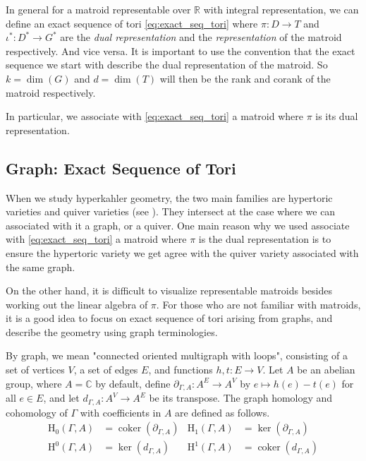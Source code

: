 \documentclass[b5paper]{article}
\newcommand{\HH}{\mathrm{H}}
\newcommand{\coker}{\operatorname{coker}}
\begin{document}
In general for a matroid representable over $\mathbb{R}$ with integral representation, we can define an exact sequence of tori \ref{eq:exact_seq_tori} where $\pi:D\rightarrow T$ and $\iota^*:D^*\rightarrow G^*$ are the \emph{dual representation} and the \emph{representation} of the matroid respectively. And vice versa. It is important to use the convention that the exact sequence we start with describe the dual representation of the matroid.
So $k=\dim(G)$ and $d=\dim(T)$ will then be the rank and corank of the matroid respectively. 

In particular, we associate with \ref{eq:exact_seq_tori} a matroid where $\pi$ is its dual representation.

\subsection{Graph: Exact Sequence of Tori}

When we study hyperkahler geometry, the two main families are hypertoric varieties and quiver varieties (see ). They intersect at the case where we can associated with it a graph, or a quiver. One main reason why we used associate with \ref{eq:exact_seq_tori} a matroid where $\pi$ is the dual representation is to ensure the hypertoric variety we get agree with the quiver variety associated with the same graph.

On the other hand, it is difficult to visualize representable matroids besides working out the linear algebra of $\pi$. For those who are not familiar with matroids, it is a good idea to focus on exact sequence of tori arising from graphs, and describe the geometry using graph terminologies. 

By graph, we mean "connected oriented multigraph with loops", consisting of a set of vertices $V$, a set of edges $E$, and functions $h,t:E\rightarrow V$.
Let $A$ be an abelian group, where $A=\mathbb{C}$ by default, define $ \partial_{\Gamma, A} : A^E \to A^V $ by $ e \mapsto h(e) - t(e) $ for all $ e \in E $, and let $ d_{\Gamma, A} : A^V \to A^E $ be its transpose.
The graph homology and cohomology of $\Gamma$ with coefficients in $A$ are defined as follows.
\begin{align*}
  \HH_0(\Gamma, A) &= \coker(\partial_{\Gamma, A}) & \HH_1(\Gamma, A) &= \ker(\partial_{\Gamma, A}) \\
  \HH^0(\Gamma, A) &= \ker(d_{\Gamma, A}) & \HH^1(\Gamma, A) &= \coker(d_{\Gamma, A})
\end{align*}
\end{document}
